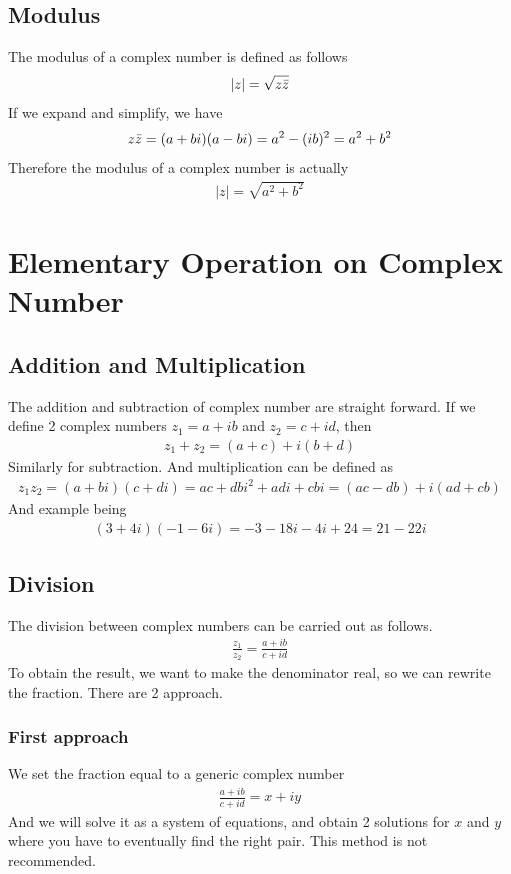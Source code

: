 \documentclass[12pt]{book}
\newcommand{\abso}[1]{\left|#1 \right|}
\begin{document}
\subsection{Modulus}
The modulus of a complex number is defined as follows
\begin{align}
    \abso{z} = \sqrt{z\Bar{z}}
\end{align}
If we expand and simplify, we have
\[
z\Bar{z}=(a+bi)(a-bi) = a^2 - (ib)^2 = a^2+b^2
\]
Therefore the modulus of a complex number is actually
\begin{align}
    \abso{z} = \sqrt{a^2 + b^2}
\end{align}



\section{Elementary Operation on Complex Number}
\subsection{Addition and Multiplication}
The addition and subtraction of complex number are straight forward. If we define 2 complex numbers $z_1 = a+ib$ and $z_2 = c+id$, then
\begin{align}
    z_1+z_2 = (a+c)+i(b+d)
\end{align}
Similarly for subtraction. And multiplication can be defined as
\begin{align}
    z_1z_2 = (a+bi)(c+di) = ac + dbi^2 + adi + cbi = (ac-db)+i(ad+cb)
\end{align}
And example being
\begin{align}
    (3+4i)(-1-6i) = -3-18i-4i+24 = 21-22i
\end{align}
\subsection{Division}
The division between complex numbers can be carried out as follows.
\begin{align}
    \frac{z_1}{z_2} = \frac{a+ib}{c+id} 
\end{align}
To obtain the result, we want to make the denominator real, so we can rewrite the fraction. There are 2 approach. 
\subsubsection{First approach}
We set the fraction equal to a generic complex number
\begin{align}
    \frac{a+ib}{c+id}  = x+iy
\end{align}
And we will solve it as a system of equations, and obtain 2 solutions for $x$ and $y$ where you have to eventually find the right pair. This method is not recommended. 
\end{document}
